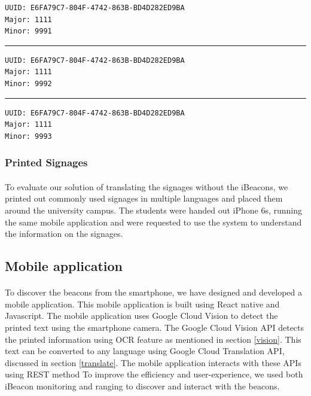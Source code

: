 \documentclass[12pt]{article}
\begin{document}
\begin{lstlisting}
UUID: E6FA79C7-804F-4742-863B-BD4D282ED9BA
Major: 1111
Minor: 9991
\end{lstlisting}

\noindent\rule{13cm}{0.4pt}

\begin{lstlisting}
UUID: E6FA79C7-804F-4742-863B-BD4D282ED9BA
Major: 1111
Minor: 9992
\end{lstlisting}

\noindent\rule{13cm}{0.4pt}

\begin{lstlisting}
UUID: E6FA79C7-804F-4742-863B-BD4D282ED9BA
Major: 1111
Minor: 9993
\end{lstlisting}

\subsubsection{Printed Signages}
\label{printed-signages}
\paragraph{}To evaluate our solution of translating the signages without the iBeacons, we printed out commonly used  signages in multiple languages and placed them around the university campus. The students were handed out iPhone 6s, running the same mobile application and were requested to use the system to understand the information on the signages.


\subsection{Mobile application}

\paragraph{}
To discover the beacons from the smartphone, we have designed and developed a mobile application. This mobile application is built using React native and Javascript. The mobile application uses Google Cloud Vision to detect the printed text using the smartphone camera. The Google Cloud Vision API detects the printed information using OCR feature as mentioned in section  \ref{vision}. This text can be converted to any language using Google Cloud Translation API, discussed in section \ref{translate}. The mobile application interacts with these APIs using REST method  To improve the efficiency and user-experience, we used both iBeacon monitoring and ranging to discover and interact with the beacons.
\end{document}
